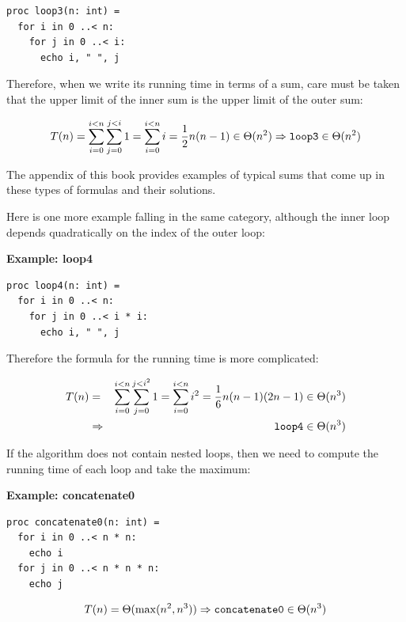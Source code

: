 \documentclass[justified, sixbynine]{tufte-book}
\def\subsubsection#1{{\bf #1}}
\theoremstyle{plain}%
\newtheorem * {corollary}{Corollary}
\theoremstyle{definition}
\theoremstyle{remark}
\newtheorem * {remark}{Remark}
\newtheorem * {note}{Note}
\begin{document}
\begin{fullwidth}
\begin{lstlisting}
proc loop3(n: int) =
  for i in 0 ..< n:
    for j in 0 ..< i:
      echo i, " ", j
\end{lstlisting}

Therefore, when we write its running time in terms of a sum, care must be taken that the upper limit of the inner sum is the upper limit of the outer sum:

\begin{equation}
T(n)=\sum_{i=0}^{i<n}\sum_{j=0}^{j<i}1=\sum_{i=0}^{i<n}i=\frac 12n(n-1)\in
\Theta (n^2)\Rightarrow \text{{\tt loop3}}\in \Theta (n^2)
\end{equation}

The appendix of this book provides examples of typical sums that come up in these types of formulas and their solutions.

Here is one more example falling in the same category, although the inner loop depends quadratically on the index of the outer loop:

\subsubsection{Example: loop4}
\begin{lstlisting}
proc loop4(n: int) =
  for i in 0 ..< n:
    for j in 0 ..< i * i:
      echo i, " ", j
\end{lstlisting}

Therefore the formula for the running time is more complicated:

\begin{eqnarray}
T(n) &=&\sum_{i=0}^{i<n}\sum_{j=0}^{j<i^2}1=\sum_{i=0}^{i<n}i^2=\frac
16n(n-1)(2n-1)\in \Theta (n^3) \\
&\Rightarrow &\text{{\tt loop4}}\in \Theta (n^3)
\end{eqnarray}

If the algorithm does not contain nested loops, then we need to compute the running time of each loop and take the maximum:

\subsubsection{Example: concatenate0}
\begin{lstlisting}
proc concatenate0(n: int) =
  for i in 0 ..< n * n:
    echo i
  for j in 0 ..< n * n * n:
    echo j
\end{lstlisting}

\begin{equation}
T(n)=\Theta (\max (n^2, n^3))\Rightarrow \text{{\tt concatenate0}}\in \Theta
(n^3)
\end{equation}


\end{fullwidth}
\end{document}
